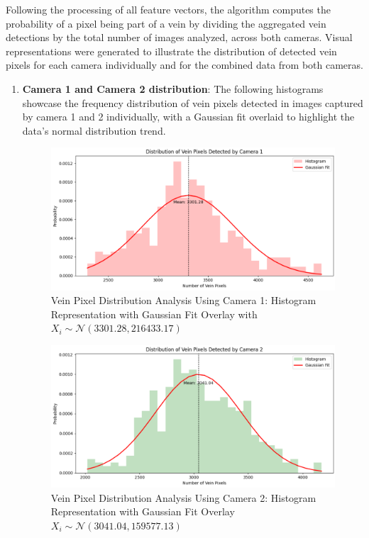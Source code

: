 Following the processing of all feature vectors, the algorithm computes the probability of a pixel being part of a vein by dividing the aggregated vein detections by the total number of images analyzed, across both cameras. Visual representations were generated to illustrate the distribution of detected vein pixels for each camera individually and for the combined data from both cameras.
\newpage
\begin{enumerate}
    \item \textbf{Camera 1 and Camera 2 distribution}: The following histograms showcase the frequency distribution of vein pixels detected in images captured by camera 1 and 2 individually, with a Gaussian fit overlaid to highlight the data's normal distribution trend.

    \begin{figure}[H]
        \centering
        \includegraphics[width=1\linewidth]{latex-img/distribution_veins_cam1.png}
        \caption{Vein Pixel Distribution Analysis Using Camera 1: Histogram Representation with Gaussian Fit Overlay with \(X_i \sim \mathcal{N}(3301.28, 216433.17)\)}
        \label{distribution_veins_cam1}
    \end{figure}

    \begin{figure}[H]
        \centering
        \includegraphics[width=1\linewidth]{latex-img/distribution_veins_cam2.png}
        \caption{Vein Pixel Distribution Analysis Using Camera 2: Histogram Representation with Gaussian Fit Overlay \(X_i \sim \mathcal{N}(3041.04, 159577.13)\)}
        \label{distribution_veins_cam2}
    \end{figure}
 

\end{enumerate}
